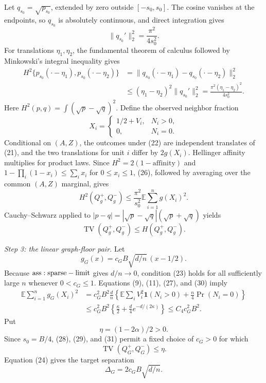Let \(q_{s_0}=\sqrt{p_{s_0}}\), extended by zero outside \([-s_0,s_0]\).  The cosine vanishes at the endpoints, so \(q_{s_0}\) is absolutely continuous, and direct integration gives
\[
 \|q_{s_0}'\|_2^2=\frac{\pi^2}{4s_0^2}.
\tag{25}
\]
For translations \(\eta_1,\eta_2\), the fundamental theorem of calculus followed by Minkowski's integral inequality gives
\[
 \begin{aligned}
 H^2\{p_{s_0}(\mathord\cdot-\eta_1),p_{s_0}(\mathord\cdot-\eta_2)\}
 &=\|q_{s_0}(\mathord\cdot-\eta_1)-q_{s_0}(\mathord\cdot-\eta_2)\|_2^2\\
 &\leq(\eta_1-\eta_2)^2\|q_{s_0}'\|_2^2
 =\frac{\pi^2(\eta_1-\eta_2)^2}{4s_0^2}.
 \end{aligned}
\tag{26}
\]
Here \(H^2(p,q)=\int(\sqrt p-\sqrt q)^2\).  Define the observed neighbor fraction
\[
 X_i=\begin{cases}1/2+V_i,&N_i>0,\\0,&N_i=0.\end{cases}
\tag{27}
\]
Conditional on \((A,Z)\), the outcomes under (22) are independent translates of (21), and the two translations for unit \(i\) differ by \(2g(X_i)\).  Hellinger affinity multiplies for product laws.  Since \(H^2=2(1-\text{affinity})\) and \(1-\prod_i(1-x_i)\leq\sum_i x_i\) for \(0\leq x_i\leq1\), (26), followed by averaging over the common \((A,Z)\) marginal, gives
\[
 H^2(Q_g^+,Q_g^-)
 \leq\frac{\pi^2}{s_0^2}\mathbb E\sum_{i=1}^ng(X_i)^2.
\tag{28}
\]
Cauchy--Schwarz applied to \(|p-q|=|\sqrt p-\sqrt q|(\sqrt p+\sqrt q)\) yields
\[
 \operatorname{TV}(Q_g^+,Q_g^-)
 \leq H(Q_g^+,Q_g^-).
\tag{29}
\]

\textit{Step 3: the linear graph-floor pair.}
Let
\[
 g_G(x)=c_GB\sqrt{d/n}\,(x-1/2).
\tag{30}
\]
Because \({\rm ass:sparse-limit}\) gives \(d/n\to0\), condition (23) holds for all sufficiently large \(n\) whenever \(0<c_G\leq1\).  Equations (9), (11), (27), and (30) imply
\[
 \begin{aligned}
 \mathbb E\sum_{i=1}^ng_G(X_i)^2
 &=c_G^2B^2\frac dn
 \left\{\mathbb E\sum_iV_i^2\mathbf1(N_i>0)
 +\frac n4\Pr(N_i=0)\right\}\\
 &\leq c_G^2B^2
 \left\{\frac\kappa2+\frac d4e^{-d/(2\kappa)}\right\}
 \leq C_4c_G^2B^2.
 \end{aligned}
\tag{31}
\]
Put
\[
 \eta=(1-2\alpha)/2>0.
\tag{32}
\]
Since \(s_0=B/4\), (28), (29), and (31) permit a fixed choice of \(c_G>0\) for which
\[
 \operatorname{TV}(Q_G^+,Q_G^-)\leq\eta.
\tag{33}
\]
Equation (24) gives the target separation
\[
 \Delta_G=2c_GB\sqrt{d/n}.
\tag{34}
\]

